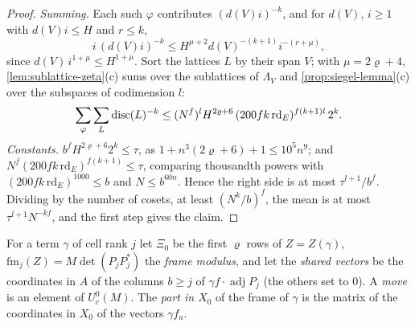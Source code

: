 \begin{proof}
\emph{Summing.} Each such $\varphi$ contributes $(d(V)i)^{-k}$, and for $d(V)$, $i\ge1$ with $d(V)i\le H$ and $r\le k$,
\[
  i\,(d(V)i)^{-k}\le H^{\mu+2}d(V)^{-(k+1)}i^{-(r+\mu)},
\]
since $d(V)\,i^{1+\mu}\le H^{1+\mu}$. Sort the lattices $L$ by their span $V$; with $\mu=2\varrho+4$, \cref{lem:sublattice-zeta}(c) sums over the sublattices of $\Lambda_V$ and \cref{prop:siegel-lemma}(c) over the subspaces
of codimension $l$:
\[
  \sum_\varphi\sum_L\operatorname{disc}(L)^{-k}\le(N^f)^lH^{2\varrho+6}\,(200fk\,\mathrm{rd}_E)^{f(k+1)l}\,2^k.
\]
\emph{Constants.} $b^fH^{2\varrho+6}2^k\le\tau$, as $1+n^3(2\varrho+6)+1\le10^5n^9$; and $N^f(200fk\,\mathrm{rd}_E)^{f(k+1)}\le\tau$, comparing thousandth powers with $(200fk\,\mathrm{rd}_E)^{1000}\le b$ and $N\le b^{60n}$. Hence the right side is
at most $\tau^{l+1}/b^f$. Dividing by the number of cosets, at least $(N^k/b)^f$, the mean is at most $\tau^{l+1}N^{-kf}$, and the first step gives the claim.
\end{proof}

For a term $\gamma$ of cell rank $j$ let $\Xi_0$ be the first $\varrho$ rows of $Z=Z(\gamma)$, $\mathrm{fm}_j(Z)=M\det(P_jP_j^*)$ the \emph{frame modulus}, and let the \emph{shared vectors} be the coordinates in $A$ of the columns $b\ge j$
of $\gamma f\cdot\operatorname{adj}P_j$ (the others set to $0$). A \emph{move} is an element of $U^0_c(M)$. The \emph{part in $X_0$} of the frame of $\gamma$ is the matrix of the coordinates in $X_0$ of the vectors $\gamma f_a$.

